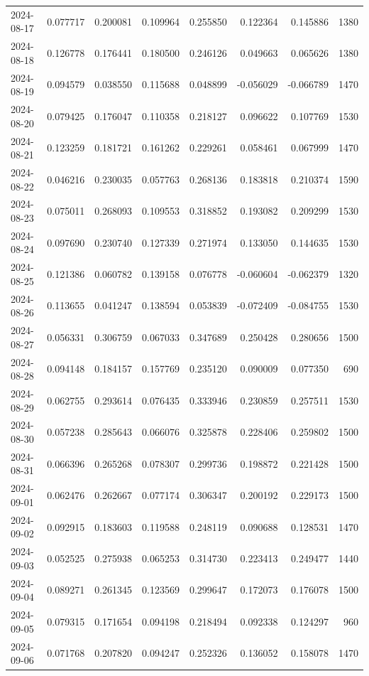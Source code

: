\begin{tabular}{lrrrrrrr}
2024-08-17 & 0.077717 & 0.200081 & 0.109964 & 0.255850 & 0.122364 & 0.145886 & 1380 \\
2024-08-18 & 0.126778 & 0.176441 & 0.180500 & 0.246126 & 0.049663 & 0.065626 & 1380 \\
2024-08-19 & 0.094579 & 0.038550 & 0.115688 & 0.048899 & -0.056029 & -0.066789 & 1470 \\
2024-08-20 & 0.079425 & 0.176047 & 0.110358 & 0.218127 & 0.096622 & 0.107769 & 1530 \\
2024-08-21 & 0.123259 & 0.181721 & 0.161262 & 0.229261 & 0.058461 & 0.067999 & 1470 \\
2024-08-22 & 0.046216 & 0.230035 & 0.057763 & 0.268136 & 0.183818 & 0.210374 & 1590 \\
2024-08-23 & 0.075011 & 0.268093 & 0.109553 & 0.318852 & 0.193082 & 0.209299 & 1530 \\
2024-08-24 & 0.097690 & 0.230740 & 0.127339 & 0.271974 & 0.133050 & 0.144635 & 1530 \\
2024-08-25 & 0.121386 & 0.060782 & 0.139158 & 0.076778 & -0.060604 & -0.062379 & 1320 \\
2024-08-26 & 0.113655 & 0.041247 & 0.138594 & 0.053839 & -0.072409 & -0.084755 & 1530 \\
2024-08-27 & 0.056331 & 0.306759 & 0.067033 & 0.347689 & 0.250428 & 0.280656 & 1500 \\
2024-08-28 & 0.094148 & 0.184157 & 0.157769 & 0.235120 & 0.090009 & 0.077350 & 690 \\
2024-08-29 & 0.062755 & 0.293614 & 0.076435 & 0.333946 & 0.230859 & 0.257511 & 1530 \\
2024-08-30 & 0.057238 & 0.285643 & 0.066076 & 0.325878 & 0.228406 & 0.259802 & 1500 \\
2024-08-31 & 0.066396 & 0.265268 & 0.078307 & 0.299736 & 0.198872 & 0.221428 & 1500 \\
2024-09-01 & 0.062476 & 0.262667 & 0.077174 & 0.306347 & 0.200192 & 0.229173 & 1500 \\
2024-09-02 & 0.092915 & 0.183603 & 0.119588 & 0.248119 & 0.090688 & 0.128531 & 1470 \\
2024-09-03 & 0.052525 & 0.275938 & 0.065253 & 0.314730 & 0.223413 & 0.249477 & 1440 \\
2024-09-04 & 0.089271 & 0.261345 & 0.123569 & 0.299647 & 0.172073 & 0.176078 & 1500 \\
2024-09-05 & 0.079315 & 0.171654 & 0.094198 & 0.218494 & 0.092338 & 0.124297 & 960 \\
2024-09-06 & 0.071768 & 0.207820 & 0.094247 & 0.252326 & 0.136052 & 0.158078 & 1470 \\

\end{tabular}
